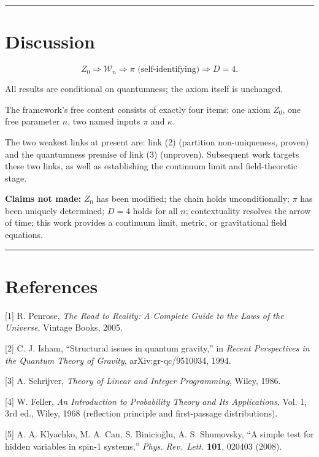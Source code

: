 \documentclass[
  11pt,
]{article}
\begin{document}
\begin{center}\rule{0.5\linewidth}{0.5pt}\end{center}

\section{Discussion}\label{discussion}

\[
Z_0 \Longrightarrow \mathcal{W}_n \Longrightarrow \pi \text{ (self-identifying)} \Longrightarrow D=4.
\]

All results are conditional on quantumness; the axiom itself is
unchanged.

The framework's free content consists of exactly four items: one axiom
\(Z_0\), one free parameter \(n\), two named inputs \(\pi\) and
\(\kappa\).

The two weakest links at present are: link (2) (partition non-uniqueness,
proven) and the quantumness premise of link (3) (unproven). Subsequent
work targets these two links, as well as establishing the continuum
limit and field-theoretic stage.

\textbf{Claims not made:} \(Z_0\) has been modified; the chain holds
unconditionally; \(\pi\) has been uniquely determined; \(D=4\) holds for
all \(n\); contextuality resolves the arrow of time; this work provides
a continuum limit, metric, or gravitational field equations.

\begin{center}\rule{0.5\linewidth}{0.5pt}\end{center}

\section*{References}\label{references}

{[}1{]} R. Penrose, \emph{The Road to Reality: A Complete Guide to the
Laws of the Universe}, Vintage Books, 2005.

{[}2{]} C. J. Isham, ``Structural issues in quantum gravity,'' in
\emph{Recent Perspectives in the Quantum Theory of Gravity},
arXiv:gr-qc/9510034, 1994.

{[}3{]} A. Schrijver, \emph{Theory of Linear and Integer Programming},
Wiley, 1986.

{[}4{]} W. Feller, \emph{An Introduction to Probability Theory and Its
Applications}, Vol. 1, 3rd ed., Wiley, 1968 (reflection principle and
first-passage distributions).

{[}5{]} A. A. Klyachko, M. A. Can, S. Binicioğlu, A. S. Shumovsky, ``A
simple test for hidden variables in spin-1 systems,'' \emph{Phys.
Rev.~Lett.} \textbf{101}, 020403 (2008).
\end{document}
